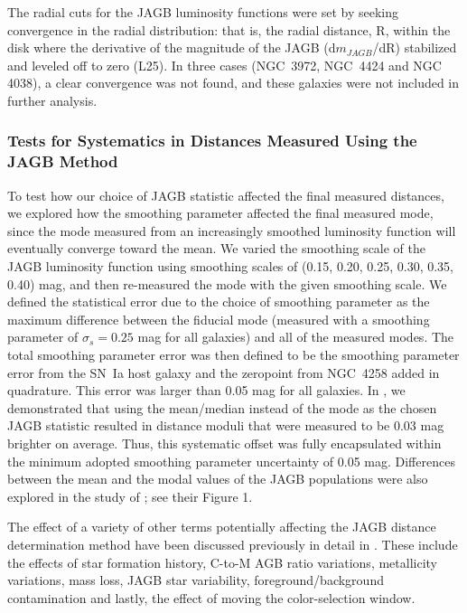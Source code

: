 \documentclass[12pt,modern]{aastex631}
\newcommand{\sn}{SN~Ia\xspace}
\newcommand{\ngc}{NGC\,\xspace}
\begin{document}
The radial cuts for the  JAGB luminosity functions  were set by seeking convergence in the radial distribution: that is, the radial distance, R,  within the disk where the derivative of the magnitude of the JAGB (d$m_{JAGB}$/dR) stabilized and leveled off to zero (L25). In three cases (\ngc 3972, \ngc 4424 and \ngc 4038), a clear convergence was not found, and these galaxies were not included in further analysis. 

\medskip\medskip\medskip\medskip
\subsubsection{Tests for Systematics in Distances Measured Using the JAGB Method}
\label{sec:jagbtests}

To test how our choice of JAGB statistic affected the final measured distances, we explored how the smoothing parameter affected the final measured mode, since the mode measured from an increasingly smoothed luminosity function will eventually converge toward the mean. We varied the smoothing scale of the JAGB luminosity function using smoothing scales of (0.15, 0.20, 0.25, 0.30, 0.35, 0.40) mag, and then re-measured the mode with the given smoothing scale. We defined the statistical error due to the choice of smoothing parameter as the maximum difference between the fiducial mode (measured with a smoothing parameter of $\sigma_s = 0.25$ mag for all galaxies) and all of the measured modes. The total smoothing parameter error was then defined to be the smoothing parameter error from the \sn host galaxy and the zeropoint from \ngc 4258 added in quadrature. This error was larger than 0.05 mag for all galaxies. In \citet{lee_2024c}, we demonstrated that using the mean/median instead of the mode as the chosen JAGB statistic resulted in distance moduli that were measured to be 0.03 mag brighter on average. Thus, this systematic offset was fully encapsulated within the minimum adopted smoothing parameter uncertainty of 0.05 mag. Differences between the mean and the modal values of the JAGB populations were also explored in the study of \citet{madore_freedman_lee_2022}; see their Figure 1. 

 
The effect of a variety of other terms potentially affecting the JAGB distance determination method have been discussed previously in detail in  \citet{freedman_madore_2020}.
These include the effects of star formation history, C-to-M AGB ratio variations, metallicity variations, mass loss, JAGB star variability, foreground/background contamination and lastly, the effect of moving the color-selection window.
\end{document}

